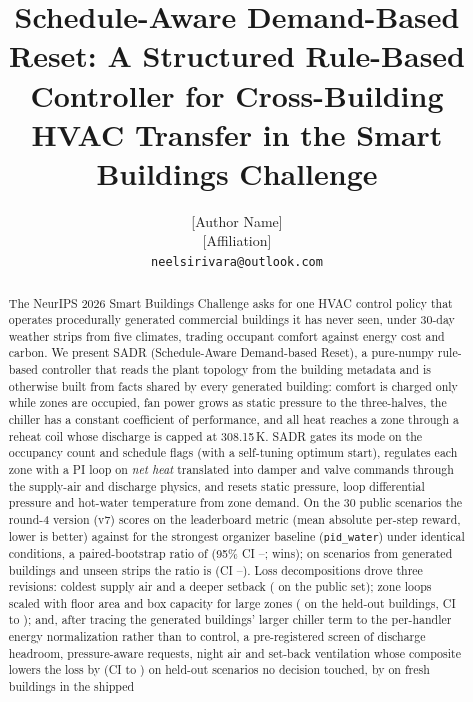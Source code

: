 \documentclass{article}
\title{Schedule-Aware Demand-Based Reset: A Structured Rule-Based Controller for Cross-Building HVAC Transfer in the Smart Buildings Challenge}
\author{%
  {[Author Name]}\\
  {[Affiliation]}\\
  \texttt{neelsirivara@outlook.com}
}
\begin{document}
\maketitle

\begin{abstract}
The NeurIPS 2026 Smart Buildings Challenge asks for one HVAC control policy that operates
procedurally generated commercial buildings it has never seen, under 30-day weather strips
from five climates, trading occupant comfort against energy cost and carbon. We present
SADR (Schedule-Aware Demand-based Reset), a pure-numpy rule-based controller that reads the
plant topology from the building metadata and is otherwise built from facts shared by every
generated building: comfort is charged only while zones are occupied, fan power grows as
static pressure to the three-halves, the chiller has a constant coefficient of performance,
and all heat reaches a zone through a reheat coil whose discharge is capped at 308.15\,K.
SADR gates its mode on the occupancy count and schedule flags (with a self-tuning optimum
start), regulates each zone with a PI loop on \emph{net heat} translated into damper and
valve commands through the supply-air and discharge physics, and resets static pressure,
loop differential pressure and hot-water temperature from zone demand. On the 30 public
scenarios the round-4 version (v7) scores \RFConfPubCand{} on the leaderboard metric (mean absolute
per-step reward, lower is better) against \MetricPidWater{} for the strongest organizer
baseline (\texttt{pid\_water}) under identical conditions, a paired-bootstrap ratio of
\RFPwPubRatio{} (95\% CI \RFPwPubRatioLo--\RFPwPubRatioHi; \RFPwPubWins{} wins); on \NHeldAll{}
scenarios from \NHeldAllBuild{} generated buildings and unseen strips the ratio is
\RFPwOldRatio{} (CI \RFPwOldRatioLo--\RFPwOldRatioHi). Loss decompositions drove three
revisions: coldest supply air and a deeper setback (\CandWinnerRelRed{} on the public set);
zone loops scaled with floor area and box capacity for large zones (\HeldAllVFiveRelRed{} on
the held-out buildings, CI \HeldAllVFiveRelRedLo{} to \HeldAllVFiveRelRedHi); and, after
tracing the generated buildings' larger chiller term to the per-handler energy normalization
rather than to control, a pre-registered screen of discharge headroom, pressure-aware
requests, night air and set-back ventilation whose composite lowers the loss by
\RFConfPoolRed{} (CI \RFConfPoolRedLo{} to \RFConfPoolRedHi) on \RFConfPoolN{} held-out
scenarios no decision touched, by \RFConfFreshShipRed{} on fresh buildings in the shipped

\end{abstract}
\end{document}
